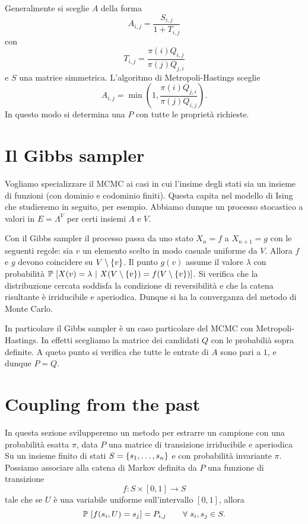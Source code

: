 \documentclass[]{marticle}
\begin{document}
Generalmente si sceglie $A$ della forma
\[
    A_{i,j} = \frac{S_{i,j}}{1+T_{i,j}}
\]
con
\[
    T_{i, j} = \frac{\pi(i) Q_{i,j}}{\pi(j) Q_{j,i}}
\]
e $S$ una matrice simmetrica.
L'algoritmo di Metropoli-Hastings sceglie
\[
    A_{i,j} = \min \left(1, \frac{\pi(i)Q_{j,i}}{\pi(j)Q_{i,j}}\right).
\]
 In questo modo si determina una $P$ con tutte le propriet\`a richieste.

\section{Il Gibbs sampler}

Vogliamo specializzare il MCMC ai casi in cui l'insime degli stati sia un
insieme di funzioni (con dominio e codominio finiti). Questa capita nel modello
di Ising che studieremo in seguito, per esempio. Abbiamo dunque un processo
stocastico a valori in $E=\Lambda^V$ per certi insiemi $\Lambda$ e $V$. 

Con il Gibbs sampler il processo passa da uno stato $X_n=f$ a $X_{n+1}=g$ con le
seguenti regole: sia $v$ un elemento scelto in modo casuale uniforme da $V$.
Allora $f$ e $g$ devono coincidere su $V\setminus\{v\}$. Il punto $g(v)$
assume il valore $\lambda$ con probabilit\`a $\prob{X(v)=\lambda \ |\ 
X(V\setminus\setof{v})=f(V\setminus\setof{v})}$. Si verifica che la
distribuzione cercata soddisfa la condizione di reversibilit\`a e che la catena
risultante \`e irriducibile e aperiodica. Dunque si ha la converganza del metodo
di Monte Carlo.

In particolare il Gibbs sampler \`e un caso particolare del MCMC con
Metropoli-Hastings. In effetti scegliamo la matrice dei candidati $Q$ con le
probabili\`a sopra definite. A queto punto si verifica che tutte le entrate di
$A$ sono pari a $1$, e dunque $P=Q$.

\section{Coupling from the past}

In questa sezione svilupperemo un metodo per estrarre un campione con una
probabilit\`a esatta $\pi$, data $P$ una matrice di transizione irriducibile e
aperiodica Su un insieme finito di stati $S=\{s_1,\dots,s_n\}$ e con
probabilit\`a invariante $\pi$. Possiamo associare alla catena di Markov
definita da $P$ una funzione di transizione 
\[
    f\colon S\times [0,1] \longrightarrow S
\]
tale che se $U$ \`e una variabile uniforme sull'intervallo $[0,1]$, allora 
\[
    \prob{f(s_i,U)=s_j}=P_{i,j} \qquad \forall s_i,s_j \in S.
\]
\end{document}
